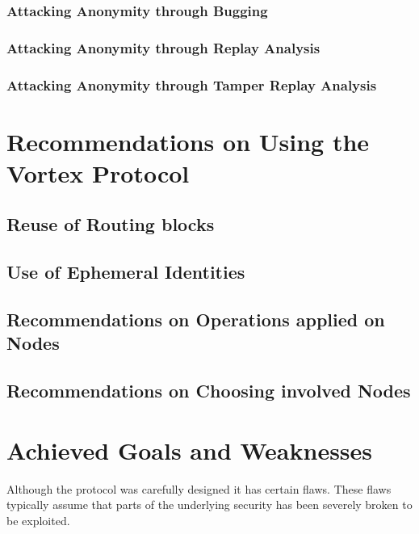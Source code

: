 \subsection{Attacking Anonymity through Bugging}

\subsection{Attacking Anonymity through Replay Analysis}

\subsection{Attacking Anonymity through Tamper Replay Analysis}

\chapter{Recommendations on Using the Vortex Protocol}

\section{Reuse of Routing blocks}

\section{Use of Ephemeral Identities}

\section{Recommendations on Operations applied on Nodes}

\section{Recommendations on Choosing involved Nodes}

\chapter{Achieved Goals and Weaknesses}
Although the protocol was carefully designed it has certain flaws. These flaws typically assume that parts of the underlying security has been severely broken to be exploited.


